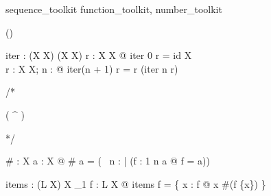 \begin{zsection}
  \SECTION sequence\_toolkit \parents function\_toolkit, number\_toolkit
\end{zsection}

\begin{zed}
   \leftassoc (\varg \upto \varg)
\end{zed}


\begin{gendef}[X]
  iter : \nat \fun (X \rel X) \fun (X \rel X)
\where
  \forall r : X \rel X @ iter 0 r = id X\\
  \forall r : X \rel X; n : \nat @ iter(n + 1) r = r \comp (iter n r)
\end{gendef}

/*
\begin{zed}
   ( \varg ^{ \varg } )
\end{zed}

*/

\begin{gendef}[X]
  \# : \finset X \fun \nat
\where
  \forall a : \finset X @ \# a = 
     (\mu~ n : \nat | (\exists f : 1 \upto n \mapsto a @ \ran f = a))
\end{gendef}



\begin{gendef}[L,X]
  items : (L \ffun X) \fun X \pfun \nat_1
\where
  \forall f : L \ffun X @
     items f = \{ x : \ran f @ x \mapsto \#(f \rres \{x\}) \}
\end{gendef}

